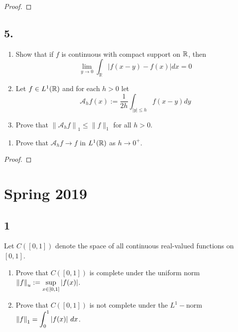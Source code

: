 \begin{proof}

\end{proof}

\hypertarget{section-4}{%
\subsection{5.}\label{section-4}}

\begin{enumerate}
\def\labelenumi{\alph{enumi}.}
\item
  Show that if \(f\) is continuous with compact support on \({\mathbb{R}}\), then
  \[
  \lim _{y \rightarrow 0} \int_{\mathbb{R}}|f(x-y)-f(x)| d x=0
  \]
\item
  Let \(f\in L^1({\mathbb{R}})\) and for each \(h > 0\) let \[
  \mathcal{A}_{h} f(x):=\frac{1}{2 h} \int_{|y| \leq h} f(x-y) d y
  \]
\item
  Prove that \(\left\|\mathcal{A}_{h} f\right\|_{1} \leq\|f\|_{1}\) for
  all \(h > 0\).
\end{enumerate}

\begin{enumerate}
\def\labelenumi{\roman{enumi}.}
\setcounter{enumi}{1}
\tightlist
\item
  Prove that \(\mathcal{A}_h f \to f\) in \(L^1({\mathbb{R}})\) as \(h \to 0^+\).
\end{enumerate}

\begin{proof}

\end{proof}

\hypertarget{spring-2019}{%
\section{Spring 2019}\label{spring-2019}}

\hypertarget{section}{%
\subsection{1}\label{section}}

Let \(C([0, 1])\) denote the space of all continuous real-valued
functions on \([0, 1]\).

\begin{enumerate}
\def\labelenumi{\alph{enumi}.}
\tightlist
\item
  Prove that \(C([0, 1])\) is complete under the uniform norm
  \({\left\lVert {f} \right\rVert}_u := \displaystyle\sup_{x\in [0,1]} |f (x)|\).
\item
  Prove that \(C([0, 1])\) is not complete under the \(L^1-\)norm
  \({\left\lVert {f} \right\rVert}_1 = \displaystyle\int_0^1 |f (x)| ~dx\).
\end{enumerate}

